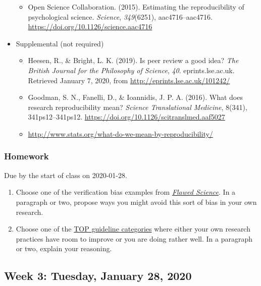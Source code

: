 \documentclass[
]{article}
\providecommand{\tightlist}{%
  \setlength{\itemsep}{0pt}\setlength{\parskip}{0pt}}
\begin{document}
\begin{itemize}
  \begin{itemize}
  \tightlist
  \item
    Open Science Collaboration. (2015). Estimating the reproducibility
    of psychological science. \emph{Science}, \emph{349}(6251),
    aac4716--aac4716. \url{https://doi.org/10.1126/science.aac4716}
  \end{itemize}
\item
  Supplemental (not required)

  \begin{itemize}
  \tightlist
  \item
    Heesen, R., \& Bright, L. K. (2019). Is peer review a good idea?
    \emph{The British Journal for the Philosophy of Science}, \emph{40}.
    eprints.lse.ac.uk. Retrieved January 7, 2020, from
    \url{http://eprints.lse.ac.uk/101242/}
  \item
    Goodman, S. N., Fanelli, D., \& Ioannidis, J. P. A. (2016). What
    does research reproducibility mean? \emph{Science Translational
    Medicine}, 8(341), 341ps12--341ps12.
    \url{https://doi.org/10.1126/scitranslmed.aaf5027}
  \item
    \url{http://www.stats.org/what-do-we-mean-by-reproducibility/}
  \end{itemize}
\end{itemize}

\hypertarget{homework-1}{%
\subsubsection{Homework}\label{homework-1}}

Due by the start of class on 2020-01-28.

\begin{enumerate}
\def\labelenumi{\arabic{enumi}.}
\tightlist
\item
  Choose one of the verification bias examples from
  \href{https://pure.mpg.de/pubman/item/item_1569964_8/component/file_1569966/Stapel_Investigation_Final_report.pdf}{\emph{Flawed
  Science}}. In a paragraph or two, propose ways you might avoid this
  sort of bias in your own research.
\item
  Choose one of the \href{https://osf.io/9f6gx/}{TOP guideline
  categories} where either your own research practices have room to
  improve or you are doing rather well. In a paragraph or two, explain
  your reasoning.
\end{enumerate}

\hypertarget{week-3-tuesday-january-28-2020}{%
\subsection{Week 3: Tuesday, January 28,
2020}\label{week-3-tuesday-january-28-2020}}
\end{document}
